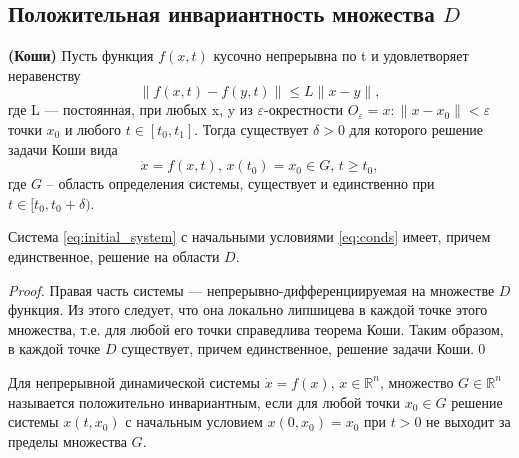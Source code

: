 \documentclass[14pt,a4paper]{extarticle}
\begin{document}
	\subsection{Положительная инвариантность множества $D$}
	
	\begin{theorem}\textbf{(Коши)}
		Пусть функция $f(x, t)$ кусочно непрерывна по t и удовлетворяет неравенству
		\[\|f(x,t)-f(y,t)\|\le L\|x-y\|,\]
		где L — постоянная, при любых x, y из $\varepsilon$-окрестности $O_{\varepsilon} = {x : \|x - x_0\| < \varepsilon}$ точки $x_0$ и любого $t \in [t_0,t_1]$. Тогда существует $\delta > 0$ для которого решение задачи Коши вида 
		\[\dot{x}=f(x,t),\, x(t_0)=x_0\in G,\, t\ge t_0,\]
		где $G$ -- область определения системы, существует и единственно при $t\in[t_0,t_0+\delta)$. 
	\end{theorem}
	
	\begin{affirmation}
		 Система \ref{eq:initial_system} с начальными условиями \ref{eq:conds} имеет, причем единственное, решение на области $D$. 
	\end{affirmation}
	\begin{proof}
		Правая часть системы --- непрерывно-дифференциируемая на множестве $D$ функция. Из этого следует, что она локально липшицева в каждой точке этого множества, т.е. для любой его точки справедлива теорема Коши. Таким образом, в каждой точке $D$ существует, причем единственное, решение задачи Коши.\qed
	\end{proof}
	
	\begin{definition}
		Для непрерывной динамической системы $\dot{x}=f(x),\, x\in\mathbb{R}^n$, множество $G\in\mathbb{R}^n$ называется положительно инвариантным, если для любой точки $x_0\in G$ решение системы $x(t,x_0)$ с начальным условием $x(0, x_0)=x_0$ при $t>0$ не выходит за пределы множества $G$. 
	\end{definition}
	
\end{document}
